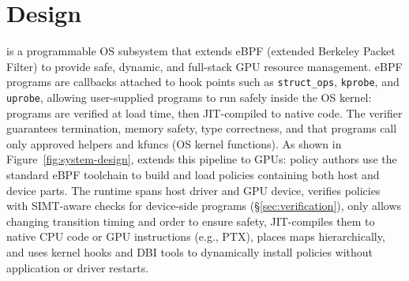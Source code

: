 \section{\sys Design}



\sys{} is a programmable OS subsystem that extends eBPF (extended Berkeley Packet Filter) to provide safe, dynamic, and full-stack GPU resource management. eBPF programs are callbacks attached to hook points such as \texttt{struct\_ops}, \texttt{kprobe}, and \texttt{uprobe}, allowing user-supplied programs to run safely inside the OS kernel: programs are verified at load time, then JIT-compiled to native code. The verifier guarantees termination, memory safety, type correctness, and that programs call only approved helpers and kfuncs (OS kernel functions). As shown in Figure~\ref{fig:system-design}, \sys{} extends this pipeline to GPUs: policy authors use the standard eBPF toolchain to build and load policies containing both host and device parts. The runtime spans host driver and GPU device, verifies policies with SIMT-aware checks for device-side programs (\S\ref{sec:verification}), only allows changing transition timing and order to ensure safety, JIT-compiles them to native CPU code or GPU instructions (e.g., PTX), places maps hierarchically, and uses kernel hooks and DBI tools to dynamically install policies without application or driver restarts.


